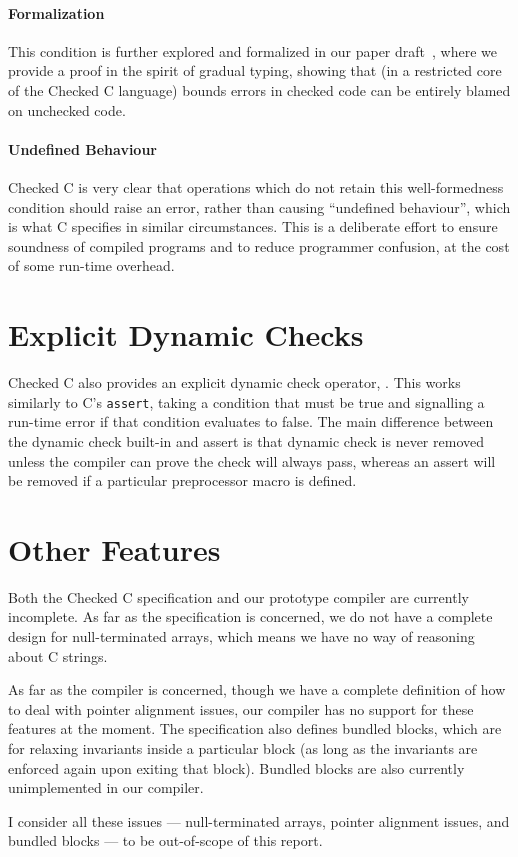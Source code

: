 \paragraph{Formalization} This condition is further explored and
formalized in our paper draft~\cite{ruef2017draft}, where we provide a
proof in the spirit of gradual typing, showing that (in a restricted
core of the Checked C language) bounds errors in checked code can be
entirely blamed on unchecked code.

\paragraph{Undefined Behaviour} Checked C is very clear that
operations which do not retain this well-formedness condition should
raise an error, rather than causing ``undefined behaviour'', which is
what C specifies in similar circumstances. This is a deliberate effort
to ensure soundness of compiled programs and to reduce programmer
confusion, at the cost of some run-time overhead.

\section{Explicit Dynamic Checks}

Checked C also provides an explicit dynamic check operator,
\kwdynamiccheck. This works similarly to C's \lstinline|assert|,
taking a condition that must be true and signalling a run-time error
if that condition evaluates to false. The main difference between the
dynamic check built-in and assert is that dynamic check is never
removed unless the compiler can prove the check will always pass,
whereas an assert will be removed if a particular preprocessor macro
is defined.

\section{Other Features}
\label{sec:other-features}

Both the Checked C specification and our prototype compiler are
currently incomplete. As far as the specification is concerned, we do
not have a complete design for null-terminated arrays, which means we
have no way of reasoning about C strings.

As far as the compiler is concerned, though we have a complete
definition of how to deal with pointer alignment issues, our compiler
has no support for these features at the moment. The specification
also defines bundled blocks, which are for relaxing invariants inside
a particular block (as long as the invariants are enforced again upon
exiting that block). Bundled blocks are also currently unimplemented
in our compiler.

I consider all these issues --- null-terminated arrays, pointer
alignment issues, and bundled blocks --- to be out-of-scope of this
report.

